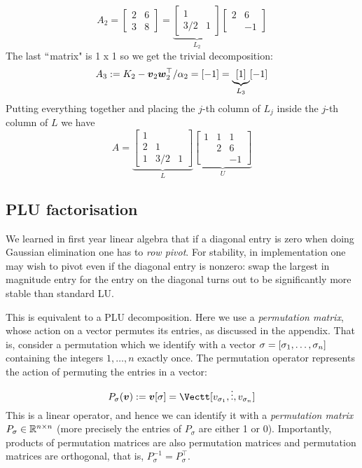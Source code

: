 \begin{example}[LU by-hand]
\[
A_2 =  \begin{bmatrix}2 & 6 \\ 3 & 8 \end{bmatrix} =
\underbrace{\begin{bmatrix}
1 \\
3/2 & 1
\end{bmatrix}}_{L_2} \begin{bmatrix} 2 & 6 \\
            & -1 \end{bmatrix}
\]
The last \ensuremath{\ldq}matrix" is 1 x 1 so we get the trivial decomposition:
\[
A_3 := K_2 - \bm{{\mbox{\boldmath$v$\unboldmath}}}_2 \bm{{\mbox{\boldmath$w$\unboldmath}}}_2^\top /\alpha_2 =  [-1] = \underbrace{[1]}_{L_3} [-1]
\]
Putting everything together and placing the $j$-th column of $L_j$ inside the $j$-th column of $L$ we have
\[
A = \underbrace{\begin{bmatrix} 1  \\
                    2 & 1 &  \\
                    1 & 3/2 & 1
                    \end{bmatrix}}_{L} \underbrace{\begin{bmatrix} 1 & 1 & 1 \\
                     & 2 & 6 \\
                     &  & -1
                    \end{bmatrix}}_U
\]
\end{example}

\subsection{PLU factorisation}
We learned in first year linear algebra that if a diagonal entry is zero when doing Gaussian elimination one has to \emph{row pivot}. For stability, in implementation one may wish to pivot even if the diagonal entry is nonzero: swap the largest in magnitude entry for the entry on the diagonal turns out to be significantly more stable than standard LU.

This is equivalent to a PLU decomposition. Here we use a \emph{permutation matrix}, whose action on a vector permutes its entries, as discussed in the appendix. That is, consider a permutation which we identify with a vector ${\mathbf \ensuremath{\sigma}} = [\ensuremath{\sigma}_1,\ensuremath{\ldots},\ensuremath{\sigma}_n]$ containing the integers $1,\ensuremath{\ldots},n$ exactly once. The permutation operator represents the action of permuting the entries in a vector:
\[
P_\ensuremath{\sigma}(\ensuremath{\bm{\v}}) := \ensuremath{\bm{\v}}[{\mathbf \ensuremath{\sigma}}] = \Vectt[v_{\ensuremath{\sigma}_1},\ensuremath{\vdots},v_{\ensuremath{\sigma}_n}]
\]
This is a linear operator, and hence we can identify it with a \emph{permutation matrix} $P_\sigma \in {\mathbb R}^{n \times n}$ (more precisely the entries  of $P_\ensuremath{\sigma}$ are either 1 or 0). Importantly, products of permutation matrices are also permutation matrices and permutation matrices are orthogonal, that is, $P_\ensuremath{\sigma}^{-1} = P_\ensuremath{\sigma}^\top$.

